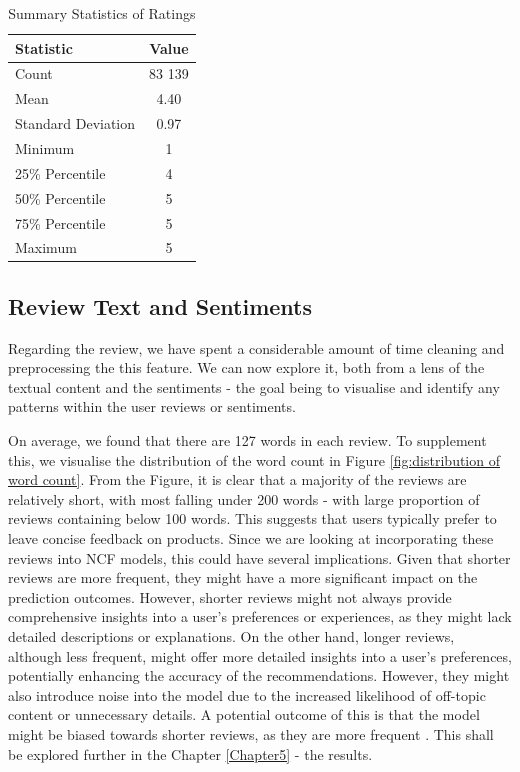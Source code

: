 \begin{table}[ht]
  \centering
  \begin{tabular}{l c}
      \hline
      \textbf{Statistic} & \textbf{Value} \\
      \hline
      Count & 83 139 \\
      Mean & 4.40 \\
      Standard Deviation & 0.97 \\
      Minimum & 1 \\
      25\% Percentile & 4 \\
      50\% Percentile & 5 \\
      75\% Percentile & 5 \\
      Maximum & 5 \\
      \hline
  \end{tabular}
  \caption{Summary Statistics of Ratings}
  \label{tab:rating summary}
\end{table}



\subsection{Review Text and Sentiments}
\label{subsec:3 Review Text}

Regarding the review, we have spent a considerable amount of time cleaning and preprocessing the this feature. We can now explore it, both from a lens of the textual content and the sentiments - the goal being to visualise and identify any patterns within the user reviews or sentiments. 

On average, we found that there are 127 words in each review. To supplement this, we visualise the distribution of the word count in Figure \ref{fig:distribution of word count}. From the Figure, it is clear that a majority of the reviews are relatively short, with most falling under 200 words - with large proportion of reviews containing below 100 words. This suggests that users typically prefer to leave concise feedback on products. Since we are looking at incorporating these reviews into NCF models, this could have several implications. Given that shorter reviews are more frequent, they might have a more significant impact on the prediction outcomes. However, shorter reviews might not always provide comprehensive insights into a user’s preferences or experiences, as they might lack detailed descriptions or explanations. On the other hand, longer reviews, although less frequent, might offer more detailed insights into a user’s preferences, potentially enhancing the accuracy of the recommendations. However, they might also introduce noise into the model due to the increased likelihood of off-topic content or unnecessary details. A potential outcome of this is that the model might be biased towards shorter reviews, as they are more frequent \cite{srifi2020recommender}. This shall be explored further in the Chapter \ref{Chapter5} - the results.

